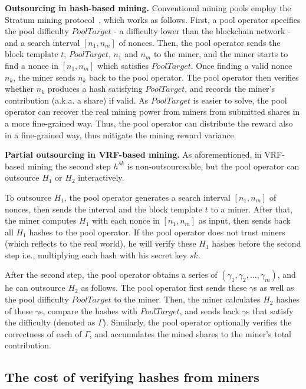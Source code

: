 \textbf{Outsourcing in hash-based mining.}
Conventional mining pools employ the Stratum mining protocol~\cite{}, which works as follows.
First, a pool operator specifies the pool difficulty $PoolTarget$ - a difficulty lower than the blockchain network - and a search interval $[n_1, n_m]$ of nonces.
Then, the pool operator sends the block template $t$, $PoolTarget$, $n_1$ and $n_m$ to the miner, and the miner starts to find a nonce in $[n_1, n_m]$ which satisfies $PoolTarget$.
Once finding a valid nonce $n_k$, the miner sends $n_k$ back to the pool operator.
The pool operator then verifies whether $n_k$ produces a hash satisfying $PoolTarget$, and records the miner's contribution (a.k.a. a share) if valid.
As $PoolTarget$ is easier to solve, the pool operator can recover the real mining power from miners from submitted shares in a more fine-grained way.
Thus, the pool operator can distribute the reward also in a fine-grained way, thus mitigate the mining reward variance.

\textbf{Partial outsourcing in VRF-based mining.}
As aforementioned, in VRF-based mining the second step $h^{sk}$ is non-outsourceable, but the pool operator can outsource $H_1$ or $H_2$ interactively.

To outsource $H_1$, the pool operator generates a search interval $[n_1, n_m]$ of nonces, then sends the interval and the block template $t$ to a miner.
After that, the miner computes $H_1$ with each nonce in $[n_1, n_m]$ as input, then sends back all $H_1$ hashes to the pool operator.
If the pool operator does not trust miners (which reflects to the real world), he will verify these $H_1$ hashes before the second step i.e., multiplying each hash with his secret key $sk$.

After the second step, the pool operator obtains a series of $(\gamma_1, \gamma_2, \dots, \gamma_m)$, and he can outsource $H_2$ as follows.
The pool operator first sends these $\gamma$s as well as the pool difficulty $PoolTarget$ to the miner.
Then, the miner calculates $H_2$ hashes of these $\gamma$s, compare the hashes with $PoolTarget$, and sends back $\gamma$s that satisfy the difficulty (denoted as $\Gamma$).
Similarly, the pool operator optionally verifies the correctness of each of $\Gamma$, and accumulates the mined shares to the miner's total contribution.


\subsection{The cost of verifying hashes from miners}

